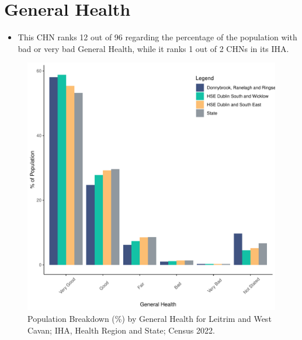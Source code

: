 \documentclass{article}
\begin{document}
\pagebreak

\section{General Health}\label{sect:GenHealth}
\begin{itemize}
\item  This CHN ranks  12 out of 96 regarding the percentage of the population with bad or very bad General Health, while it ranks   1 out of 2 CHNs in its IHA.
\end{itemize}
\begin{figure}[h]
	\centering
	\includegraphics[width = 150mm]{../figures/GenED.pdf}
	\caption{Population Breakdown (\%) by General Health for Leitrim and West Cavan; IHA, Health Region and State;  Census 2022.}
	\label{fig:2ae19629-1a6a-13a3-e055-000000000001}
	\end{figure}
\end{document}
